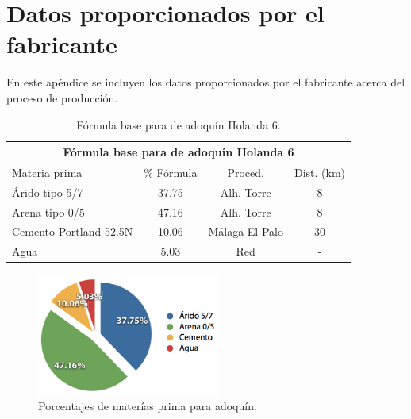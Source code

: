 \chapter{Datos proporcionados por el fabricante}\label{apend:datos}
En este apéndice se incluyen los datos proporcionados por el fabricante acerca del proceso de producción.

\begin{table}[!htb]
\centering
\begin{tabular}{lccc}
\toprule
\multicolumn{4}{c}{Fórmula base para de adoquín Holanda 6}\\
\midrule
Materia prima & \% Fórmula & Proced. & Dist. (\si{km})\\
\midrule
Árido tipo 5/7 & 37.75 & Alh. Torre & 8\\
Arena tipo 0/5 & 47.16 & Alh. Torre & 8\\
Cemento Portland 52.5N & 10.06 & Málaga-El Palo & 30\\
Agua & 5.03 & Red & -\\
\bottomrule
\end{tabular}
\caption{Fórmula base para de adoquín Holanda 6.}
\label{formulabase}
\end{table}

\begin{figure}[!htb]
\centering
\includegraphics[width=6cm]{porcent_matprima.png}
\caption{Porcentajes de materías prima para adoquín.}
\label{fig:porcentmatprima}
\end{figure}

